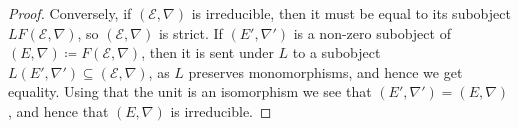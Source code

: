 \documentclass[10pt,a4paper]{amsart}
\newcommand{\E}{\mathcal E}
\begin{document}
\begin{proof}
Conversely, if $(\E,\nabla)$ is irreducible, then it must be equal to its subobject $LF(\E,\nabla)$, so $(\E,\nabla)$ is strict. If $(E',\nabla')$ is a non-zero subobject of $(E,\nabla)\coloneqq F(\E,\nabla)$, then it is sent under $L$ to a subobject $L(E',\nabla')\subseteq(\E,\nabla)$, as $L$ preserves monomorphisms, and hence we get equality. Using that the unit is an isomorphism we see that $(E',\nabla')=(E,\nabla)$, and hence that $(E,\nabla)$ is irreducible.
\end{proof}
\end{document}
